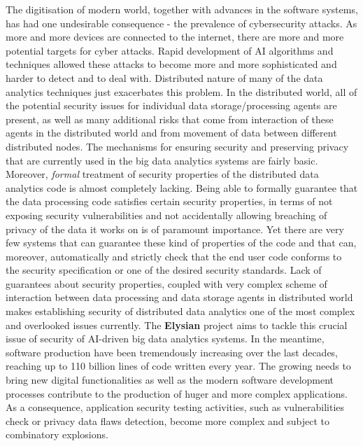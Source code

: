 \documentclass[a4paper,11pt]{article}
\newcommand{\project}[1]{\textbf{#1}\xspace}
\newcommand{\SECURITY}{\project{Elysian}}
\newcommand{\TheProject}{\SECURITY}
\begin{document}
The digitisation of modern world, together with advances in the software systems, has had one undesirable consequence - the prevalence of cybersecurity attacks. As more and more devices are connected to the internet, there are more and more potential targets for cyber attacks. Rapid development of AI algorithms and techniques allowed these attacks to become more and more sophisticated and harder to detect and to deal with. Distributed nature of many of the data analytics techniques just exacerbates this problem. In the distributed world, all of the potential security issues for individual data storage/processing agents are present, as well as many additional risks that come from interaction of these agents in the distributed world and from movement of data between different distributed nodes. The mechanisms for ensuring security and preserving privacy that are currently used in the big data analytics systems are fairly basic. Moreover, \emph{formal} treatment of security properties of the distributed data analytics code is almost completely lacking. Being able to formally guarantee that the data processing code satisfies certain security properties, in terms of not exposing security vulnerabilities and not accidentally allowing breaching of privacy of the data it works on is of paramount importance. Yet there are very few systems that can guarantee these kind of properties of the code and that can, moreover, automatically and strictly check that the end user code conforms to the security specification or one of the desired security standards. Lack of guarantees about security properties, coupled with very complex scheme of interaction between data processing and data storage agents in distributed world makes establishing security of distributed data analytics one of the most complex and overlooked issues currently. The \TheProject{} project aims to tackle this crucial issue of security of AI-driven big data analytics systems.
In the meantime, software production have been tremendously increasing over the last decades, reaching up to 110 billion lines of code written every year. The growing needs to bring new digital functionalities as well as the modern software development processes contribute to the production of huger and more complex applications. As a consequence, application security testing activities, such as vulnerabilities check or privacy data flaws detection, become more complex and subject to combinatory explosions.
\end{document}
